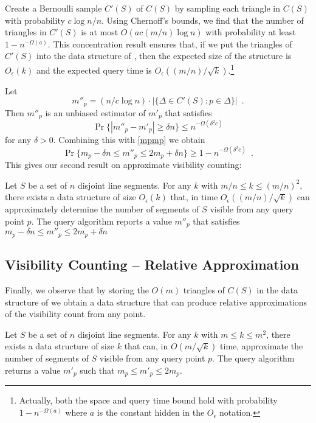 \documentclass{patmorin}
\newcommand{\Oe}{O_\epsilon}
\begin{document}
Create a Bernoulli sample $C'(S)$ of $C(S)$ by sampling each triangle
in $C(S)$ with probability $c\log n / n$.  Using Chernoff's bounds, we
find that the number of triangles in $C'(S)$ is at most $O(ac(m/n)\log
n)$ with probability at least $1-n^{-\Omega(a)}$.  This concentration
result ensures that, if we put the triangles of $C'(S)$ into the
data structure of , then the expected
size of the structure is $\Oe(k)$ and the expected query time is
$\Oe((m/n)/\sqrt{k})$.\footnote{Actually, both the space and query time
bound hold with probability $1-n^{-\Omega(a)}$ where $a$ is the constant
hidden in the $\Oe$ notation.}

Let
\[
   m''_p= (n/c\log n)\cdot|\{\Delta\in C'(S): p\in \Delta\}| \enspace .
\]
Then $m''_p$ is an unbiased estimator of $m'_p$ that satisfies
\[
   \Pr\{|m''_p - m'_p| \ge \delta n\} \le n^{-\Omega(\delta^2 c)}
\]
for any $\delta > 0$.
Combining this with \eqref{mpmp} we obtain
\[
   \Pr\{m_p-\delta n \le m''_p \le 2m_p+\delta n\} 
     \ge 1-n^{-\Omega(\delta^2 c)}  \enspace .
\]
This gives our second result on approximate visibility counting:

\begin{thm}
Let $S$ be a set of $n$ disjoint line segments.  For any $k$ with $m/n
\le k \le (m/n)^2$, there exists a data structure of size $\Oe(k)$ that,
in time $\Oe((m/n)/\sqrt{k})$ can approximately determine the number of
segments of $S$ visible from any query point $p$.  The query algorithm
reports a value $m''_p$ that satisfies $m_p-\delta n \le m''_p \le
2m_p+\delta n$
\end{thm}

\subsection{Visibility Counting -- Relative Approximation}

Finally, we observe that by storing the $O(m)$ triangles of $C(S)$ in the
data structure of  we obtain a data structure
that can produce relative approximations of the visibility count from any
point.

\begin{thm}
Let $S$ be a set of $n$ disjoint line segments. For any $k$ with $m\le
k\le m^2$,  there exists a data structure of size $k$ that can, in
$O(m/\sqrt{k})$ time, approximate the number of segments
of $S$ visible from any query point $p$.  The query algorithm returns a
value $m'_p$ such that $m_p \le m'_p \le 2m_p$.
\end{thm}
\end{document}
